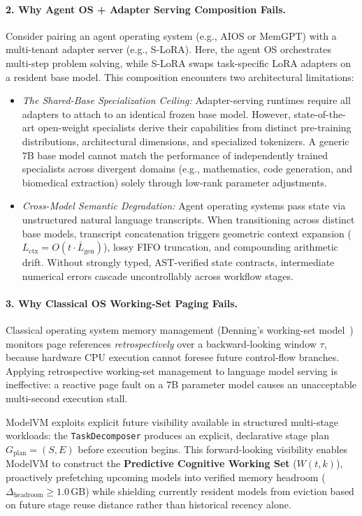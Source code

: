 \paragraph{2. Why Agent OS + Adapter Serving Composition Fails.}
Consider pairing an agent operating system (e.g., AIOS or MemGPT) with a multi-tenant adapter server (e.g., S-LoRA). Here, the agent OS orchestrates multi-step problem solving, while S-LoRA swaps task-specific LoRA adapters on a resident base model. This composition encounters two architectural limitations:
\begin{itemize}
    \item \textit{The Shared-Base Specialization Ceiling:} Adapter-serving runtimes require all adapters to attach to an identical frozen base model. However, state-of-the-art open-weight specialists derive their capabilities from distinct pre-training distributions, architectural dimensions, and specialized tokenizers. A generic 7B base model cannot match the performance of independently trained specialists across divergent domains (e.g., mathematics, code generation, and biomedical extraction) solely through low-rank parameter adjustments.
    \item \textit{Cross-Model Semantic Degradation:} Agent operating systems pass state via unstructured natural language transcripts. When transitioning across distinct base models, transcript concatenation triggers geometric context expansion ($L_{\text{ctx}} = O(t \cdot \bar{L}_{\text{gen}})$), lossy FIFO truncation, and compounding arithmetic drift. Without strongly typed, AST-verified state contracts, intermediate numerical errors cascade uncontrollably across workflow stages.
\end{itemize}

\paragraph{3. Why Classical OS Working-Set Paging Fails.}
Classical operating system memory management (Denning's working-set model~\cite{denning1968working}) monitors page references \textit{retrospectively} over a backward-looking window $\tau$, because hardware CPU execution cannot foresee future control-flow branches. Applying retrospective working-set management to language model serving is ineffective: a reactive page fault on a 7B parameter model causes an unacceptable multi-second execution stall.

ModelVM exploits explicit future visibility available in structured multi-stage workloads: the \texttt{TaskDecomposer} produces an explicit, declarative stage plan $G_{\text{plan}} = (S, E)$ before execution begins. This forward-looking visibility enables ModelVM to construct the \textbf{Predictive Cognitive Working Set} ($W(t, k)$), proactively prefetching upcoming models into verified memory headroom ($\Delta_{\text{headroom}} \ge 1.0\,\text{GB}$) while shielding currently resident models from eviction based on future stage reuse distance rather than historical recency alone.

